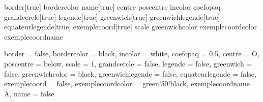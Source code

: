 
 {border}[true]{}
 {bordercolor}{}
 {name}[true]{}
 {centre}{}
 {poscentre}{}
 {incolor}{}
 {coefopaq}{}
 {grandcercle}[true]{}
 {legende}[true]{}
 {greenwich}[true]{}
 {greenwichlegende}[true]{}
 {equateurlegende}[true]{}
 {exemplecoord}[true]{}
 {scale}{}
 {greenwichcolor}{}
 {exemplecoordcolor}{}
 {exemplecoordname}{}

 {	border = false,
								bordercolor = black,
 							 	incolor = white,
 							 	coefopaq = 0.5,
 							 	centre = O,
 							 	poscentre = below,
 							 	scale = 1,
 							 	grandcercle = false,
 							 	legende = false,
								greenwich = false, %
								greenwichcolor = black, %
								greenwichlegende = false, %
								equateurlegende = false, %
								exemplecoord = false, %
								exemplecoordcolor = green!50!black, %
								exemplecoordname = A, %
 							 	name = false}{}

\newcommand*{\boule}[1][]{\pasBoule[#1]}

